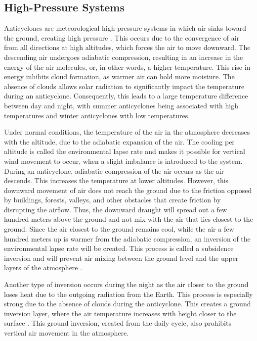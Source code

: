 \subsection{High-Pressure Systems}
Anticyclones are meteorological high-pressure systems in which air sinks toward the ground, creating high pressure \cite{spiridonovCyclonesAnticyclonesSpringerLink2020}. This occurs due to the convergence of air from all directions at high altitudes, which forces the air to move downward. The descending air undergoes adiabatic compression, resulting in an increase in the energy of the air molecules, or, in other words, a higher temperature. This rise in energy inhibits cloud formation, as warmer air can hold more moisture. The absence of clouds allows solar radiation to significantly impact the temperature during an anticyclone. Consequently, this leads to a large temperature difference between day and night, with summer anticyclones being associated with high temperatures and winter anticyclones with low temperatures. 

Under normal conditions, the temperature of the air in the atmosphere decreases with the altitude, due to the adiabatic expansion of the air. The cooling per altitude is called the environmental lapse rate and makes it possible for vertical wind movement to occur, when a slight imbalance is introduced to the system. During an anticyclone, adiabatic compression of the air occurs as the air descends. This increases the temperature at lower altitudes. However, this downward movement of air does not reach the ground due to the friction opposed by buildings, forests, valleys, and other obstacles that create friction by disrupting the airflow. Thus, the downward draught will spread out a few hundred meters above the ground and not mix with the air that lies closest to the ground. Since the air closest to the ground remains cool, while the air a few hundred meters up is warmer from the adiabatic compression, an inversion of the environmental lapse rate will be created. This process is called a subsidence inversion and will prevent air mixing between the ground level and the upper layers of the atmosphere \cite{gramschInfluenceSurfaceSubsidence2014}.


 Another type of inversion occurs during the night as the air closer to the ground loses heat due to the outgoing radiation from the Earth. This process is especially strong due to the absence of clouds during the anticyclone. This creates a ground inversion layer, where the air temperature increases with height closer to the surface \cite{gregohareWeatherClimateClimate2005}. This ground inversion, created from the daily cycle, also prohibits vertical air movement in the atmosphere.


